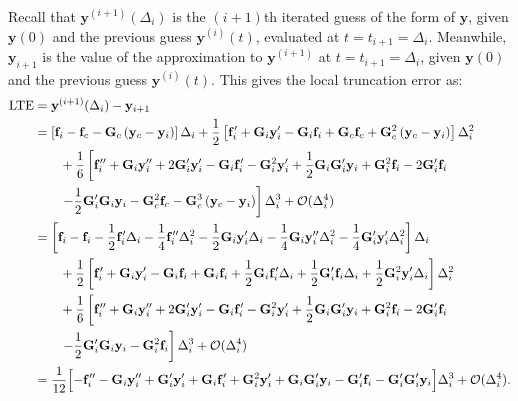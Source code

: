 Recall that $\mathbf{y}^{(i+1)}(\Delta_i)$ is the $(i+1)$th iterated guess of the form of $\mathbf{y}$, given $\mathbf{y}(0)$ and the previous guess $\mathbf{y}^{(i)}(t)$, evaluated at $t = t_{i+1} = \Delta_i$. Meanwhile, $\mathbf{y}_{i+1}$ is the value of the approximation to $\mathbf{y}^{(i+1)}$ at $t = t_{i+1} = \Delta_i$, given $\mathbf{y}(0)$ and the previous guess $\mathbf{y}^{(i)}(t)$.
This gives the local truncation error as: 
\begin{equation}
\begin{split}
    \textrm{LTE} & = \mathbf{y}^{(i+1)}(\Delta_i)-\mathbf{y}_{i+1} \\
    & = \left[\mathbf{f}_i-\mathbf{f}_c-\mathbf{G}_c\left(\mathbf{y}_c-\mathbf{y}_i\right)\right]\Delta_i + \frac{1}{2}\left[\mathbf{f}_i'+\mathbf{G}_i\mathbf{y}_i'-\mathbf{G}_i\mathbf{f}_i+\mathbf{G}_c\mathbf{f}_c+\mathbf{G}_c^2\left(\mathbf{y}_c-\mathbf{y}_i\right)\right]\Delta_i^2 \\
    &  \qquad + \frac{1}{6}\left[\mathbf{f}_i''+\mathbf{G}_i\mathbf{y}_i''+2\mathbf{G}_i'\mathbf{y}_i'-\mathbf{G}_i\mathbf{f}_i'-\mathbf{G}_i^2\mathbf{y}_i' + \frac{1}{2}\mathbf{G}_i\mathbf{G}_i'\mathbf{y}_i+\mathbf{G}_i^2\mathbf{f}_i - 2\mathbf{G}_i'\mathbf{f}_i \right. \\ 
    & \qquad \left. -\frac{1}{2}\mathbf{G}_i'\mathbf{G}_i\mathbf{y}_i-\mathbf{G}_c^2\mathbf{f}_c-\mathbf{G}_c^3\left(\mathbf{y}_c-\mathbf{y}_i\right)\right]\Delta_i^3 + \mathcal{O}(\Delta_i^4) \\ 
    & = \left[\mathbf{f}_i - \mathbf{f}_i - \frac{1}{2}\mathbf{f}_i'\Delta_i - \frac{1}{4} \mathbf{f}_i''\Delta_i^2 - \frac{1}{2}\mathbf{G}_i\mathbf{y}_i'\Delta_i - \frac{1}{4}\mathbf{G}_i\mathbf{y}_i''\Delta_i^2 - \frac{1}{4}\mathbf{G}_i'\mathbf{y}_i'\Delta_i^2\right]\Delta_i \\
    & \qquad + \frac{1}{2}\left[\mathbf{f}_i'+\mathbf{G}_i\mathbf{y}_i'-\mathbf{G}_i\mathbf{f}_i+\mathbf{G}_i\mathbf{f}_i + \frac{1}{2}\mathbf{G}_i\mathbf{f}_i'\Delta_i + \frac{1}{2}\mathbf{G}_i'\mathbf{f}_i\Delta_i + \frac{1}{2}\mathbf{G}_i^2\mathbf{y}_i'\Delta_i\right]\Delta_i^2 \\
    &  \qquad + \frac{1}{6}\left[\mathbf{f}_i''+\mathbf{G}_i\mathbf{y}_i''+2\mathbf{G}_i'\mathbf{y}_i'-\mathbf{G}_i\mathbf{f}_i'-\mathbf{G}_i^2\mathbf{y}_i' + \frac{1}{2}\mathbf{G}_i\mathbf{G}_i'\mathbf{y}_i+\mathbf{G}_i^2\mathbf{f}_i - 2\mathbf{G}_i'\mathbf{f}_i \right. \\ 
    & \qquad \left. -\frac{1}{2}\mathbf{G}_i'\mathbf{G}_i\mathbf{y}_i-\mathbf{G}_i^2\mathbf{f}_i\right]\Delta_i^3 + \mathcal{O}(\Delta_i^4) \\
    & = \frac{1}{12}\Bigl[-\mathbf{f}_i'' - \mathbf{G}_i\mathbf{y}_i'' + \mathbf{G}_i'\mathbf{y}_i' + \mathbf{G}_i\mathbf{f}_i' + \mathbf{G}_i^2\mathbf{y}_i' + \mathbf{G}_i\mathbf{G}_i'\mathbf{y}_i - \mathbf{G}_i'\mathbf{f}_i - \mathbf{G}_i'\mathbf{G}_i'\mathbf{y}_i\Bigr]\Delta_i^3 + \mathcal{O}(\Delta_i^4).
\end{split}
\end{equation}
